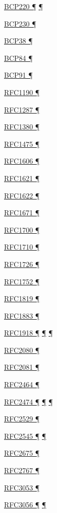 \documentclass[
]{article}
\begin{document}
\hyperref[ipv6-basic-technology]{BCP220 ¶} \hyperref[further-reading]{¶}

\hyperref[extension-headers-and-options]{BCP230 ¶}

\hyperref[filtering]{BCP38 ¶}

\hyperref[multi-prefix-operation]{BCP84 ¶}

\hyperref[dns]{BCP91 ¶}

\hyperref[why-version-6]{RFC1190 ¶}

\hyperref[why-ipv6-is-so-complicated]{RFC1287 ¶}

\hyperref[why-ipv6-is-so-complicated]{RFC1380 ¶}

\hyperref[why-version-6]{RFC1475 ¶}

\hyperref[why-version-6]{RFC1606 ¶}

\hyperref[why-ipv6-is-so-complicated]{RFC1621 ¶}

\hyperref[why-ipv6-is-so-complicated]{RFC1622 ¶}

\hyperref[why-ipv6-is-so-complicated]{RFC1671 ¶}

\hyperref[why-version-6]{RFC1700 ¶}

\hyperref[why-ipv6-is-so-complicated]{RFC1710 ¶}

\hyperref[why-ipv6-is-so-complicated]{RFC1726 ¶}

\hyperref[why-ipv6-is-so-complicated]{RFC1752 ¶}

\hyperref[why-version-6]{RFC1819 ¶}

\hyperref[why-version-6]{RFC1883 ¶}

\hyperref[dual-stack-scenarios]{RFC1918 ¶} \hyperref[tunnels]{¶}
\hyperref[obsolete-features-in-ipv6]{¶}

\hyperref[routing]{RFC2080 ¶}

\hyperref[routing]{RFC2081 ¶}

\hyperref[layer-2-functions]{RFC2464 ¶}

\hyperref[packet-format]{RFC2474 ¶}
\hyperref[traffic-class-and-flow-label]{¶}
\hyperref[transport-protocols]{¶}

\hyperref[obsolete-techniques]{RFC2529 ¶}

\hyperref[routing]{RFC2545 ¶} \hyperref[routing-operation]{¶}

\hyperref[packet-size-and-jumbo-frames]{RFC2675 ¶}

\hyperref[obsolete-techniques]{RFC2767 ¶}

\hyperref[obsolete-techniques]{RFC3053 ¶}

\hyperref[why-ipv6-is-so-complicated]{RFC3056 ¶}
\hyperref[obsolete-techniques]{¶}
\end{document}
